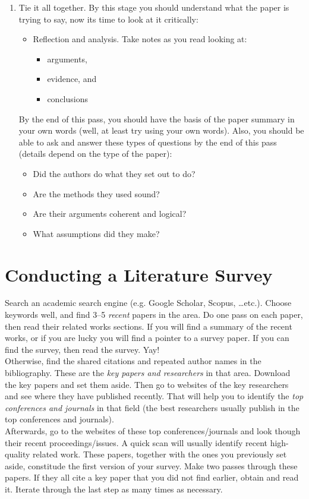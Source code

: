 \documentclass[a4paper]{article}
\begin{document}
\begin{enumerate}
  \item Tie it all together. By this stage you should understand what the paper is trying to say, now its time to look at it critically:
  \renewcommand{\labelitemi}{$\square$}
  	\begin{itemize}
		\item Reflection and analysis. Take notes as you read looking at:
			\begin{itemize}
			\item arguments,
			\item evidence, and
			\item conclusions
			\end{itemize}
	\end{itemize}
   By the end of this pass, you should have the basis of the paper summary in your own words (well, at least try using your own words). Also, you should be able to ask and answer these types of questions by the end of this pass (details depend on the type of the paper):
   \renewcommand{\labelitemi}{\textbullet}
   \begin{itemize}
   \item Did the authors do what they set out to do?
   \item Are the methods they used sound?
   \item Are their arguments coherent and logical?
   \item What assumptions did they make?
   \end{itemize}

\end{enumerate}


\section{Conducting a Literature Survey}
\label{sec:2}
Search an academic search engine (e.g. Google Scholar, Scopus, \ldots etc.). Choose keywords well, and find 3--5 \emph{recent} papers in the area. Do one pass on each paper, then read their related works sections. If you will find a summary of the recent works, or if you are lucky you will find a pointer to a survey paper. If you can find the survey, then read the survey. Yay!\\

Otherwise, find the shared citations and repeated author names in the bibliography. These are the \emph{key papers and researchers} in that area. Download the key papers and set them aside. Then go to websites of the key researchers and see where they have published recently. That will help you to identify the \emph{top conferences and journals} in that field (the best researchers usually publish in the top conferences and journals).\\

Afterwards, go to the websites of these top conferences/journals and look though their recent proceedings/issues. A quick scan will usually identify recent high-quality related work. These papers, together with the ones you previously set aside, constitude the first version of your survey. Make two passes through these papers. If they all cite a key paper that you did not find earlier, obtain and read it. Iterate through the last step as many times as necessary.
\end{document}

